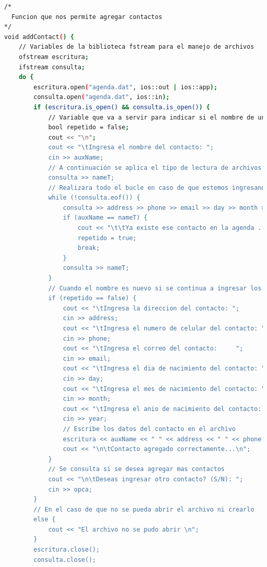 \documentclass[12pt]{article}
\begin{document}
\begin{lstlisting}[language=bash,frame=single,style=CStyle]
/*
  Funcion que nos permite agregar contactos
*/
void addContact() {
    // Variables de la biblioteca fstream para el manejo de archivos
    ofstream escritura;
    ifstream consulta;
    do {
        escritura.open("agenda.dat", ios::out | ios::app);
        consulta.open("agenda.dat", ios::in);
        if (escritura.is_open() && consulta.is_open()) {
            // Variable que va a servir para indicar si el nombre de un alumno ya existe o no
            bool repetido = false;
            cout << "\n";
            cout << "\tIngresa el nombre del contacto: ";
            cin >> auxName;
            // A continuación se aplica el tipo de lectura de archivos secuencial
            consulta >> nameT;
            // Realizara todo el bucle en caso de que estemos ingresando un nombre ya existente en otro contacto
            while (!consulta.eof()) {
                consulta >> address >> phone >> email >> day >> month >> year;
                if (auxName == nameT) {
                    cout << "\t\tYa existe ese contacto en la agenda ...\n";
                    repetido = true;
                    break;
                }
                consulta >> nameT;
            }
            // Cuando el nombre es nuevo si se continua a ingresar los datos del nuevo conctacto
            if (repetido == false) {
                cout << "\tIngresa la direccion del contacto: ";
                cin >> address;
                cout << "\tIngresa el numero de celular del contacto: ";
                cin >> phone;
                cout << "\tIngresa el correo del contacto:     ";
                cin >> email;
                cout << "\tIngresa el dia de nacimiento del contacto: ";
                cin >> day;
                cout << "\tIngresa el mes de nacimiento del contacto: ";
                cin >> month;
                cout << "\tIngresa el anio de nacimiento del contacto: ";
                cin >> year;
                // Escribe los datos del contacto en el archivo
                escritura << auxName << " " << address << " " << phone << " " << email << " " << day << " " << month << " " << year << endl;
                cout << "\n\tContacto agregado correctamente...\n";
            }
            // Se consulta si se desea agregar mas contactos
            cout << "\n\tDeseas ingresar otro contacto? (S/N): ";
            cin >> opca;
        }
        // En el caso de que no se pueda abrir el archivo ni crearlo
        else {
            cout << "El archivo no se pudo abrir \n";
        }
        escritura.close();
        consulta.close();


\end{lstlisting}
\end{document}
